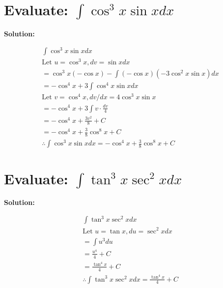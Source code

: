 \documentclass{article}
\begin{document}
\newpage
\section{Evaluate: $\int \cos^3 x \sin x dx$}

\textbf{Solution:}

\begin{align*}
     & \int \cos^3 x \sin x dx                                                   \\
     & \text{Let } u = \cos^3 x, dv = \sin x dx                                  \\
     & = \cos^3 x (-\cos x) - \int (-\cos x) (-3\cos^2 x \sin x) dx              \\
     & = -\cos^4 x + 3 \int \cos^4 x \sin x dx                                   \\
     & \text{Let } v = \cos^4 x, dv/dx = 4\cos^3 x \sin x                        \\
     & = -\cos^4 x + 3 \int v \cdot \frac{dv}{4}                                 \\
     & = -\cos^4 x + \frac{3v^2}{8} + C                                          \\
     & = -\cos^4 x + \frac{3}{8} \cos^8 x + C                                    \\
     & \therefore \int \cos^3 x \sin x dx = -\cos^4 x + \frac{3}{8} \cos^8 x + C
\end{align*}

\section{Evaluate: $\int \tan^3 x \sec^2 x dx$}

\textbf{Solution:}

\begin{align*}
     & \int \tan^3 x \sec^2 x dx                                     \\
     & \text{Let } u = \tan x, du = \sec^2 x dx                      \\
     & = \int u^3 du                                                 \\
     & = \frac{u^4}{4} + C                                           \\
     & = \frac{\tan^4 x}{4} + C                                      \\
     & \therefore \int \tan^3 x \sec^2 x dx = \frac{\tan^4 x}{4} + C
\end{align*}
\end{document}
